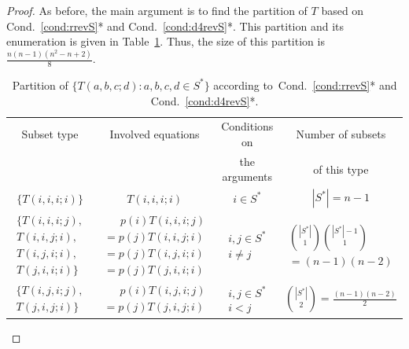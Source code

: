 \documentclass[10pt]{amsart}
\theoremstyle{definition}\newtheorem{defi}[theo]{Definition}\newtheorem{rema}[theo]{Remark}\newtheorem{exam}[theo]{Example}\newtheorem{exem}[theo]{Example}\newtheorem{nota}[theo]{Notation}
\newcounter{a}
\newcommand{\Cond}{Cond.}
\begin{document}
\begin{proof}
As before, the main argument is to find the partition of $T$ based on \Cond~\ref{cond:rrevS}* and \Cond~\ref{cond:d4revS}*. This partition and its enumeration is given in Table~\ref{table:part11}. Thus, the size of this partition is $ \frac{n (n-1) (n^2-n+2)}{8}$.


\begin{table}[!ht]
\renewcommand{\arraystretch}{1.25}
\caption{Partition of $\{T(a,b,c;d) : a,b,c,d \in S^*\}$ according to~\Cond~\ref{cond:rrevS}* and \Cond~\ref{cond:d4revS}*.} \label{table:part11}
{\footnotesize
\begin{tabular}{|c|c|c|c|}
\hline Subset type & Involved equations & Conditions on & Number of subsets \\
& & the arguments & of this type \\
\hline $\{T(i,i,i;i)\}$ & $T(i,i,i;i)$ & $i\in S^*$ & $|S^*|=n-1$ \\
\hline $
\begin{matrix} \{T(i,i,i;j), \\ T(i,i,j;i), \\ T(i,j,i;i),\\ T(j,i,i;i)\}
\end{matrix}$ & $
\begin{matrix} \phantom{=}\, p(i) T(i,i,i;j) \\ = p(j) T(i,i,j;i) \\ = p(j) T(i,j,i;i) \\ = p(j) T(j,i,i;i)
\end{matrix}$ & $
\begin{matrix} i,j \in S^* \\ i \neq j
\end{matrix}$ & $
\begin{matrix} \displaystyle \binom{|S^*|}{1} \binom{|S^*|-1}{1} \\ \displaystyle = (n-1) (n-2)
\end{matrix}$ \\
\hline $
\begin{matrix} \{T(i,j,i;j),\\ T(j,i,j;i)\}
\end{matrix}$ & $
\begin{matrix} \phantom{=}\, p(i) T(i,j,i;j) \\ = p(j) T(j,i,j;i)
\end{matrix}$ & $
\begin{matrix} i,j \in S^* \\ i < j
\end{matrix}$ & $\displaystyle \binom{|S^*|}{2} = \frac{(n-1)(n-2)}{2}$ \\

\end{tabular}}
\end{table}
\end{proof}
\end{document}
